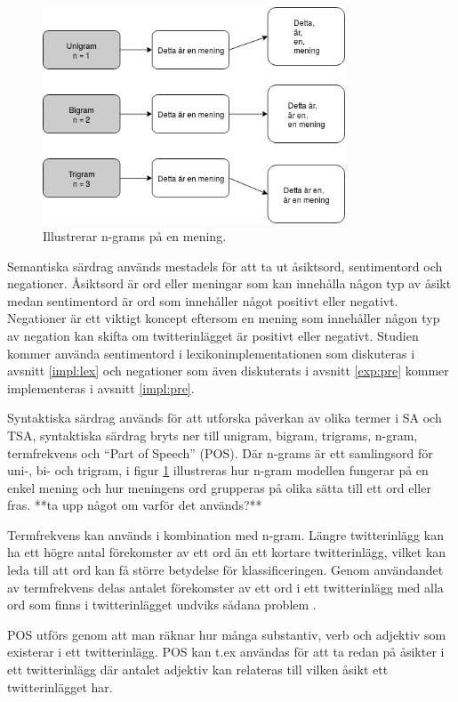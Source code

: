 \documentclass{kaumasters} %
\begin{document}
\begin{figure}[H]
\includegraphics[width=9cm]{grams}
\centering
\caption{Illustrerar n-grams på en mening.}
\label{fig:grams}
\end{figure}

Semantiska särdrag används mestadels för att ta ut  åsiktsord, sentimentord och negationer. Åsiktsord är ord eller meningar som kan innehålla någon typ av åsikt medan sentimentord är ord som innehåller något positivt eller negativt. Negationer är ett viktigt koncept eftersom en mening som innehåller någon typ av negation kan skifta om twitterinlägget är positivt eller negativt. Studien kommer använda sentimentord i lexikonimplementationen som diskuteras i avsnitt \ref{impl:lex} och negationer som även diskuterats i avsnitt \ref{exp:pre} kommer implementeras i avsnitt \ref{impl:pre}.

Syntaktiska särdrag används för att utforska påverkan av olika termer i SA och TSA, syntaktiska särdrag bryts ner till unigram, bigram, trigrams, n-gram, termfrekvens och “Part of Speech” (POS). Där n-grams är ett samlingsord för uni-, bi- och trigram, i figur \ref{fig:grams} illustreras hur n-gram modellen fungerar på en enkel mening och hur meningens ord grupperas på olika sätta till ett ord eller fras. **ta upp något om varför det används?**

Termfrekvens kan används i kombination med n-gram. Längre twitterinlägg kan ha ett högre antal förekomster av ett ord än ett kortare twitterinlägg, vilket kan leda till att ord kan få större betydelse för klassificeringen. Genom användandet av termfrekvens delas antalet förekomster av ett ord i ett twitterinlägg med alla ord som finns i twitterinlägget undviks sådana problem \cite{scikit:001}.

POS utförs genom att man räknar hur många substantiv, verb och adjektiv som existerar i ett twitterinlägg. POS kan t.ex användas för att ta redan på åsikter i ett twitterinlägg där antalet adjektiv kan relateras till vilken åsikt ett twitterinlägget har.
\end{document}
